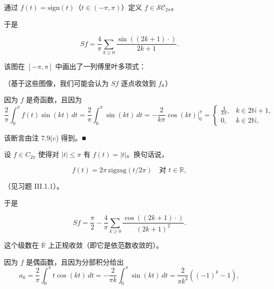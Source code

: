 \begin{example}

\begin{items}
\item

通过 $ f(t) = \mathrm{sign}(t) $（$ t \in (-\pi, \pi) $）定义 $ f \in \mathcal{SC}_{2\pi} $。

\end{items}


于是

\[
Sf = \frac{4}{\pi}\sum_{k \ge 0}\frac{\sin((2k+1)\cdot)}{2k+1} .
\]

该图在 $ [-\pi, \pi] $ 中画出了一列傅里叶多项式：


（基于这些图像，我们可能会认为 $ Sf $ 逐点收敛到 $ f $。）

\proofhead
因为 $ f $ 是奇函数，且因为
\begin{equation*}
\frac{2}{\pi}\int_{0}^{\pi} f(t)\sin(kt) \, dt = \frac{2}{\pi}\int_{0}^{\pi}\sin(kt) \, dt = -\frac{2}{k\pi}\cos(kt)\big|_{0}^{\pi} = \begin{cases} \frac{4}{k\pi} , & k \in 2\mathbb{N} + 1 , \\ 0 , & k \in 2\mathbb{N} , \end{cases}
\end{equation*}

该断言由注 7.9(c) 得到。\nobreak\hspace{0.35em}■

\begin{items}
\item[（b）]

设 $ f \in C_{2\pi} $ 使得对 $ |t| \le \pi $ 有 $ f(t) = |t| $。换句话说，

\[
f(t) = 2\pi\,\mathrm{zigzag}(t/2\pi) \quad \text{对 } t \in \mathbb{R} ,
\]

（见习题 III.1.1）。

\end{items}


于是

\[
Sf = \frac{\pi}{2} - \frac{4}{\pi}\sum_{k \ge 0}\frac{\cos((2k+1)\cdot)}{(2k+1)^{2}} .
\]

这个级数在 $ \mathbb{R} $ 上正规收敛（即它是依范数收敛的）。

\proofhead
因为 $ f $ 是偶函数，且因为分部积分给出
\[
a_{k} = \frac{2}{\pi}\int_{0}^{\pi} t\cos(kt) \, dt = -\frac{2}{\pi k}\int_{0}^{\pi}\sin(kt) \, dt = \frac{2}{\pi k^{2}}((-1)^{k} - 1) ,
\]


\end{example}
